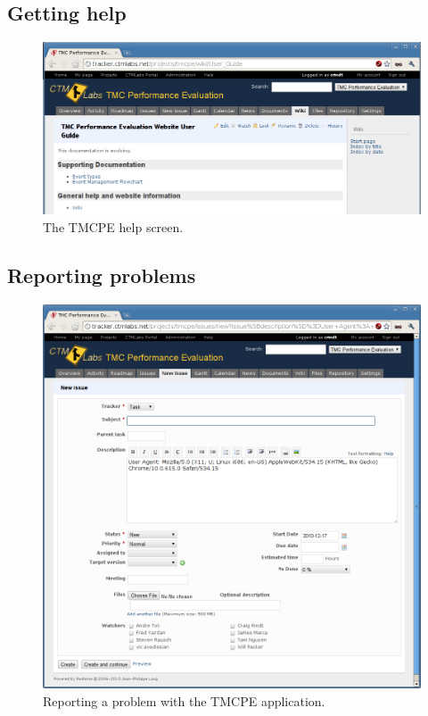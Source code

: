 \documentclass[12pt]{report}
\begin{document}
\subsection{Getting help}
\label{sec:ui-help}

\begin{figure}[t]
  \begin{center}
    \includegraphics[width=\textwidth]{images/tmcpe-main-help.png}
    \caption{The TMCPE help screen.}
    \label{fig:tmcpe-main-help}
  \end{center}
\end{figure}


\subsection{Reporting problems}
\label{sec:ui-prob}

\begin{figure}[t]
  \begin{center}
    \includegraphics[width=\textwidth]{images/tmcpe-report-problem.png}
    \caption{Reporting a problem with the TMCPE application.}
    \label{fig:tmcpe-report-problem}
  \end{center}
\end{figure}
\end{document}
